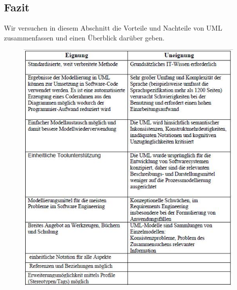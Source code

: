 \subsection{Fazit}

Wir versuchen in diesem Abschnitt die Vorteile und Nachteile von UML zusammenfassen und einen Überblick darüber geben.

\begin{center}
	\begin{figure}[h]
		
		\includegraphics[scale=1]{Graphics/vornachteil.jpg} 
		
		
		
		\label{fig11}
		
		
	\end{figure}
\end{center}
\clearpage